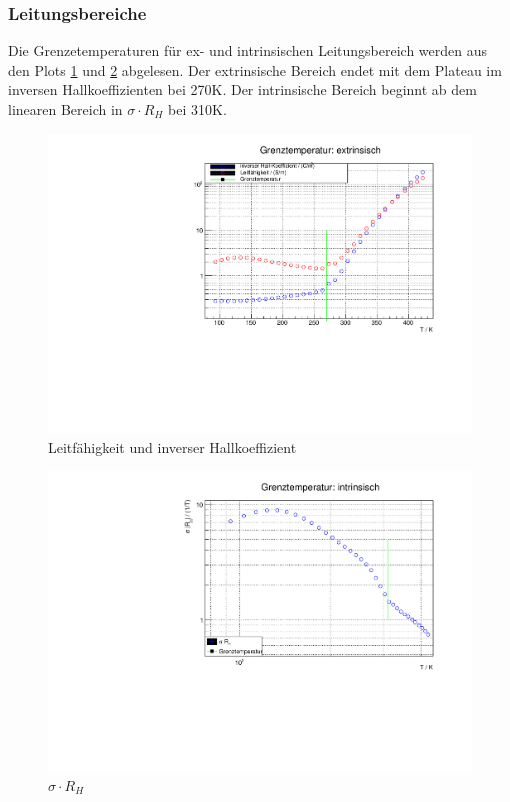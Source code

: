 
\FloatBarrier
\subsubsection{Leitungsbereiche}

Die Grenzetemperaturen für ex- und intrinsischen Leitungsbereich werden aus den Plots \ref{fig:leitex} und \ref{fig:leitin} abgelesen.
Der extrinsische Bereich endet mit dem Plateau im inversen Hallkoeffizienten bei 270K. Der intrinsische Bereich beginnt ab dem linearen Bereich in $\sigma \cdot R_{H}$ bei 310K.

\begin{figure}
\label{fig:leitex}
\centering
\includegraphics[scale = 0.5]{../data/A2ex.pdf}
\caption{Leitfähigkeit und inverser Hallkoeffizient}
\end{figure}

\begin{figure}
\label{fig:leitin}
\centering
\includegraphics[scale = 0.5]{../data/A2in.pdf}
\caption{$\sigma \cdot R_{H}$}
\end{figure}

